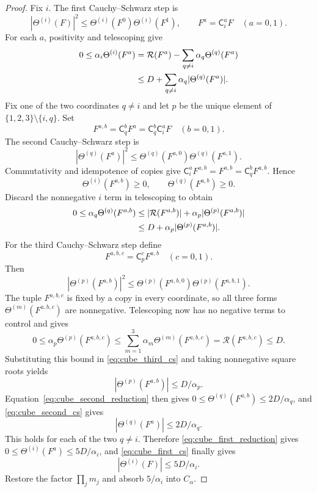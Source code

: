 \documentclass[12pt,reqno]{amsart}
\theoremstyle{plain}
\theoremstyle{definition}
\theoremstyle{remark}
\numberwithin{equation}{section}
\begin{document}
\begin{proof}
Fix $i$. The first Cauchy--Schwarz step is
\begin{equation}\label{eq:cube_first_cs}
 |\Theta^{(i)}(F)|^2
 \le\Theta^{(i)}(F^0)\Theta^{(i)}(F^1),\qquad
 F^a=\mathsf C_i^aF\quad(a=0,1).
\end{equation}
For each $a$, positivity and telescoping give
\begin{align}
 0\le\alpha_i\Theta^{(i)}(F^a)
 &=\mathcal R(F^a)-\sum_{q\ne i}\alpha_q\Theta^{(q)}(F^a)\notag\\
 &\le D+\sum_{q\ne i}\alpha_q|\Theta^{(q)}(F^a)|.
                                                  \label{eq:cube_first_reduction}
\end{align}
Fix one of the two coordinates $q\ne i$ and let $p$ be the unique
element of $\{1,2,3\}\setminus\{i,q\}$. Set
\[
 F^{a,b}=\mathsf C_q^bF^a
        =\mathsf C_q^b\mathsf C_i^aF\quad(b=0,1).
\]
The second Cauchy--Schwarz step is
\begin{equation}\label{eq:cube_second_cs}
 |\Theta^{(q)}(F^a)|^2
       \le\Theta^{(q)}(F^{a,0})\Theta^{(q)}(F^{a,1}).
\end{equation}
Commutativity and idempotence of copies give
$\mathsf C_i^aF^{a,b}=F^{a,b}=\mathsf C_q^bF^{a,b}$. Hence
\[
 \Theta^{(i)}(F^{a,b})\ge0,\qquad
 \Theta^{(q)}(F^{a,b})\ge0.
\]
Discard the nonnegative $i$ term in telescoping to obtain
\begin{align}
 0\le\alpha_q\Theta^{(q)}(F^{a,b})
     &\le|\mathcal R(F^{a,b})|+
                         \alpha_p|\Theta^{(p)}(F^{a,b})|\notag\\
     &\le D+\alpha_p|\Theta^{(p)}(F^{a,b})|.
                                      \label{eq:cube_second_reduction}
\end{align}
For the third Cauchy--Schwarz step define
\[
 F^{a,b,c}=\mathsf C_p^cF^{a,b}\quad(c=0,1).
\]
Then
\begin{equation}\label{eq:cube_third_cs}
 |\Theta^{(p)}(F^{a,b})|^2
       \le\Theta^{(p)}(F^{a,b,0})\Theta^{(p)}(F^{a,b,1}).
\end{equation}
The tuple $F^{a,b,c}$ is fixed by a copy in every coordinate, so
all three forms $\Theta^{(m)}(F^{a,b,c})$ are nonnegative.
Telescoping now has no negative terms to control and gives
\[
 0\le\alpha_p\Theta^{(p)}(F^{a,b,c})
   \le\sum_{m=1}^3\alpha_m\Theta^{(m)}(F^{a,b,c})
   =\mathcal R(F^{a,b,c})\le D.
\]
Substituting this bound in \eqref{eq:cube_third_cs} and taking
nonnegative square roots yields
\[
 |\Theta^{(p)}(F^{a,b})|\le D/\alpha_p.
\]
Equation~\eqref{eq:cube_second_reduction} then gives
$0\le\Theta^{(q)}(F^{a,b})\le2D/\alpha_q$, and
\eqref{eq:cube_second_cs} gives
\[
 |\Theta^{(q)}(F^a)|\le2D/\alpha_q.
\]
This holds for each of the two $q\ne i$. Therefore
\eqref{eq:cube_first_reduction} gives
$0\le\Theta^{(i)}(F^a)\le5D/\alpha_i$, and
\eqref{eq:cube_first_cs} finally gives
\[
 |\Theta^{(i)}(F)|\le5D/\alpha_i.
\]
Restore the factor $\prod_jm_j$ and absorb $5/\alpha_i$ into $C_\alpha$.
\end{proof}
\end{document}
